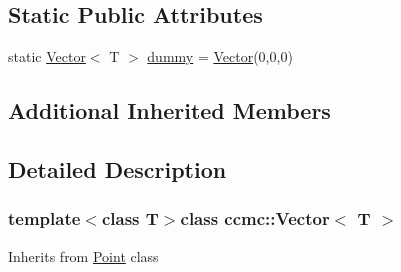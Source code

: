 \subsection*{Static Public Attributes}
\begin{DoxyCompactItemize}
\item 
static \hyperlink{classccmc_1_1_vector}{Vector}$<$ T $>$ \hyperlink{classccmc_1_1_vector_a5c7540edf3dc29eef60ec9379c12a79b}{dummy} = \hyperlink{classccmc_1_1_vector}{Vector}(0,0,0)
\end{DoxyCompactItemize}
\subsection*{Additional Inherited Members}


\subsection{Detailed Description}
\subsubsection*{template$<$class T$>$class ccmc\-::\-Vector$<$ T $>$}

Inherits from \hyperlink{classccmc_1_1_point}{Point} class 

